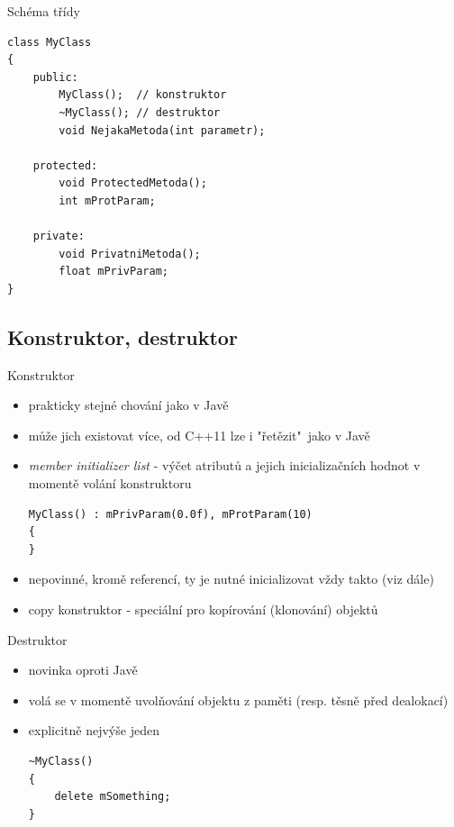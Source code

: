 \documentclass{beamer}
\begin{document}
\begin{xframe}{Schéma třídy}
\begin{lstlisting}[basicstyle=\ttfamily\small]
class MyClass
{
    public:
        MyClass();  // konstruktor
        ~MyClass(); // destruktor
        void NejakaMetoda(int parametr);

    protected:
        void ProtectedMetoda();
        int mProtParam;

    private:
        void PrivatniMetoda();
        float mPrivParam;
}
\end{lstlisting}
\end{xframe}

\subsection{Konstruktor, destruktor}

\begin{xframe}{Konstruktor}
	\begin{itemize}
		\item prakticky stejné chování jako v Javě
		\item může jich existovat více, od C++11 lze i "řetězit"~jako v Javě
		\item \emph{member initializer list} - výčet atributů a jejich inicializačních hodnot v momentě volání konstruktoru
\begin{lstlisting}[basicstyle=\ttfamily\small]
MyClass() : mPrivParam(0.0f), mProtParam(10)
{
}
\end{lstlisting}
		\item nepovinné, kromě referencí, ty je nutné inicializovat vždy takto (viz dále)
		\item copy konstruktor - speciální pro kopírování (klonování) objektů
	\end{itemize}
\end{xframe}


\begin{xframe}{Destruktor}
	\begin{itemize}
		\item novinka oproti Javě
		\item volá se v momentě uvolňování objektu z paměti (resp. těsně před dealokací)
		\item explicitně nejvýše jeden
\begin{lstlisting}[basicstyle=\ttfamily\small]
~MyClass()
{
    delete mSomething;
}
\end{lstlisting}
	\end{itemize}
\end{xframe}
\end{document}
